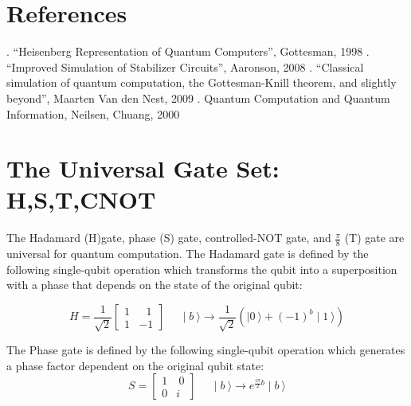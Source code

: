 \documentclass[reqno]{amsart}
\theoremstyle{definition}
\theoremstyle{remark}
\begin{document}
\section{References}
. “Heisenberg Representation of Quantum Computers”, Gottesman, 1998
. “Improved Simulation of Stabilizer Circuits”, Aaronson, 2008
.  “Classical simulation of quantum computation, the Gottesman-Knill theorem, and slightly beyond”, Maarten Van den Nest, 2009
. Quantum Computation and Quantum Information, Neilsen, Chuang, 2000
\newline




\newpage
\appendix
\section{The Universal Gate Set: H,S,T,CNOT}

\noindent
\noindent
The Hadamard (H)gate, phase (S) gate, controlled-NOT gate, and $\frac{\pi}{8}$ (T) gate
are universal for quantum computation. 
\noindent
The Hadamard gate is defined by the following single-qubit operation
which transforms the qubit into a superposition with a phase that depends on the state
of the original qubit:

\begin{equation}
H=
\frac{1}{\sqrt{2}}
\begin{bmatrix}
 1 &\:\:\:1
 \\1 &-1 
\end{bmatrix}
\:\:\:\:\:\:
\mid b\:\rangle\rightarrow \frac{1}{\sqrt{2}}(\mid0\:\rangle+(-1)^b\mid1\:\rangle)
\end{equation}

\noindent
The Phase gate is defined by the following single-qubit operation which
generates a phase factor dependent on the original qubit state:
\begin{equation}
S=
\begin{bmatrix}
 1 &\:0
 \\0 &i 
\end{bmatrix}
\:\:\:\:\:\:
\mid b\:\rangle\rightarrow e^{\frac{i\pi}{2}b}\mid b\:\rangle
\end{equation}
\end{document}
